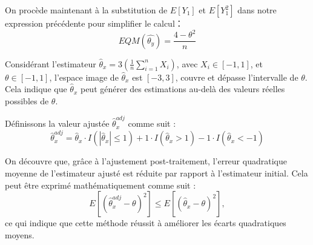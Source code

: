 \documentclass[../main.tex]{subfiles}
\begin{document}
\begin{CJK*}{UTF8}{gbsn}
On procède maintenant à la substitution de $E[Y_1]$ et $E[Y_1^2]$ dans notre expression précédente pour simplifier
le calcul：
\begin{equation*}
EQM(\hat{\theta_y}) = \frac{4 - \theta^2}{n}
\end{equation*}

Considérant l'estimateur \(\hat{\theta}_x = 3\left(\frac{1}{n}\sum_{i=1}^{n}X_i\right)\), avec \(X_i \in [-1, 1]\), 
et \( \theta \in [-1, 1] \), 
l'espace image de $\hat{\theta}_x$ est $[-3, 3]$, 
couvre et dépasse l'intervalle de $\theta$. 
Cela indique que $\hat{\theta}_x$ peut générer des estimations 
au-delà des valeurs réelles possibles de $\theta$.

Définissons la valeur ajustée $\hat{\theta}_{x}^{adj} $ comme suit :
\begin{equation*}
\hat{\theta}_{x}^{adj} = \hat{\theta}_x \cdot I(|\hat{\theta}_x| \leq 1) + 1 \cdot I(\hat{\theta}_x > 1) - 1 \cdot I(\hat{\theta}_x < -1)
\end{equation*}

On découvre que, grâce à l'ajustement post-traitement, 
l'erreur quadratique moyenne de l'estimateur ajusté est réduite par rapport à l'estimateur initial. 
Cela peut être exprimé mathématiquement comme suit :
\begin{equation*}
E\left[(\hat{\theta}_{x}^{adj} - \theta)^2\right] \leq E\left[(\hat{\theta}_x - \theta)^2\right],
\end{equation*}
ce qui indique que cette méthode réussit à améliorer les écarts quadratiques moyens.


\end{CJK*}
\end{document}
